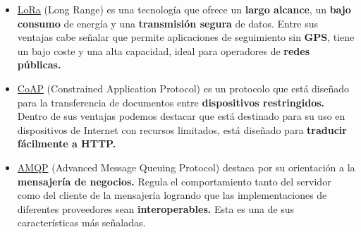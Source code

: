 \begin{itemize}  
	\item \href{https://www.lora-alliance.org/What-Is-LoRa/Technology}{LoRa} (Long Range) es una tecnología que ofrece un \textbf{largo alcance}, un \textbf{bajo consumo} de energía y una \textbf{transmisión segura} de datos. Entre sus ventajas cabe señalar que permite aplicaciones de seguimiento sin \textbf{GPS}, tiene un bajo coste y una alta capacidad, ideal para operadores de \textbf{redes públicas.}
	\item \href{https://en.wikipedia.org/wiki/Constrained_Application_Protocol}{CoAP} (Constrained Application Protocol) es un protocolo que está diseñado para la transferencia de documentos entre \textbf{dispositivos restringidos.} Dentro de sus ventajas podemos destacar que está destinado para su uso en dispositivos de Internet con recursos limitados, está diseñado para \textbf{traducir fácilmente a HTTP.}
	\item \href{https://www.amqp.org/}{AMQP} (Advanced Message Queuing Protocol) destaca por su orientación a la \textbf{mensajería de negocios.} Regula el comportamiento tanto del servidor como del cliente de la mensajería logrando que las implementaciones de diferentes proveedores sean \textbf{interoperables.} Esta es una de sus características más señaladas.
	
	

\end{itemize}




